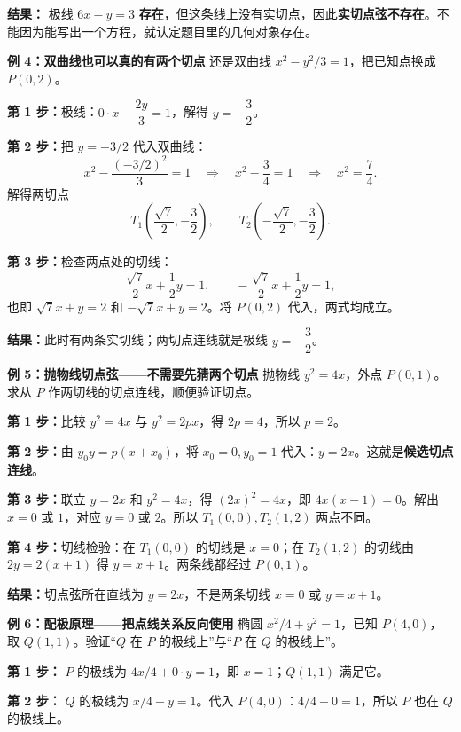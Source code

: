 \begin{examplebox}
\textbf{结果：} 极线 $\boxed{6x-y=3}$ \textbf{存在}，但这条线上没有实切点，因此\textbf{实切点弦不存在}。不能因为能写出一个方程，就认定题目里的几何对象存在。

\medskip
\textbf{\textcolor{CExample}{例 4：双曲线也可以真的有两个切点}}
还是双曲线 $x^2-y^2/3=1$，把已知点换成 $P(0,2)$。

\textbf{第 1 步：}极线：$0\cdot x-\dfrac{2y}{3}=1$，解得 $y=-\dfrac32$。

\textbf{第 2 步：}把 $y=-3/2$ 代入双曲线：
\[
x^2-\frac{(-3/2)^2}{3}=1
\quad\Longrightarrow\quad x^2-\frac34=1
\quad\Longrightarrow\quad x^2=\frac74.
\]
解得两切点
\[
T_1\left(\frac{\sqrt7}{2},-\frac32\right),\qquad
T_2\left(-\frac{\sqrt7}{2},-\frac32\right).
\]

\textbf{第 3 步：}检查两点处的切线：
\[
\frac{\sqrt7}{2}x+\frac12y=1,
\qquad
-\frac{\sqrt7}{2}x+\frac12y=1,
\]
也即 $\sqrt7x+y=2$ 和 $-\sqrt7x+y=2$。将 $P(0,2)$ 代入，两式均成立。

\textbf{结果：}此时有两条实切线；两切点连线就是极线 $\boxed{y=-\dfrac32}$。

\medskip
\textbf{\textcolor{CExample}{例 5：抛物线切点弦——不需要先猜两个切点}}
抛物线 $y^2=4x$，外点 $P(0,1)$。求从 $P$ 作两切线的切点连线，顺便验证切点。


\begin{center}\end{center}
\textbf{第 1 步：}比较 $y^2=4x$ 与 $y^2=2px$，得 $2p=4$，所以 $p=2$。

\textbf{第 2 步：}由 $y_0y=p(x+x_0)$，将 $x_0=0,y_0=1$ 代入：$y=2x$。这就是\textbf{候选切点连线}。

\textbf{第 3 步：}联立 $y=2x$ 和 $y^2=4x$，得 $(2x)^2=4x$，即 $4x(x-1)=0$。解出 $x=0$ 或 $1$，对应 $y=0$ 或 $2$。所以 $T_1(0,0),T_2(1,2)$ 两点不同。

\textbf{第 4 步：}切线检验：在 $T_1(0,0)$ 的切线是 $x=0$；在 $T_2(1,2)$ 的切线由 $2y=2(x+1)$ 得 $y=x+1$。两条线都经过 $P(0,1)$。

\textbf{结果：}切点弦所在直线为 $\boxed{y=2x}$，不是两条切线 $x=0$ 或 $y=x+1$。

\medskip
\textbf{\textcolor{CExample}{例 6：配极原理——把点线关系反向使用}}
椭圆 $x^2/4+y^2=1$，已知 $P(4,0)$，取 $Q(1,1)$。验证“$Q$ 在 $P$ 的极线上”与“$P$ 在 $Q$ 的极线上”。

\textbf{第 1 步：} $P$ 的极线为 $4x/4+0\cdot y=1$，即 $x=1$；$Q(1,1)$ 满足它。

\textbf{第 2 步：} $Q$ 的极线为 $x/4+y=1$。代入 $P(4,0)$：$4/4+0=1$，所以 $P$ 也在 $Q$ 的极线上。


\end{examplebox}
